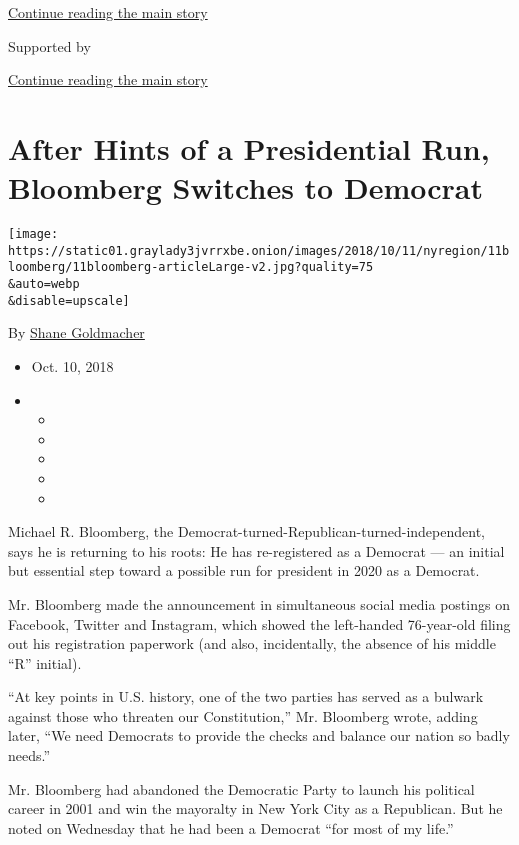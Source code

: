 \protect\hyperlink{after-top}{Continue reading the main story}

Supported by

\protect\hyperlink{after-sponsor}{Continue reading the main story}

\hypertarget{after-hints-of-a-presidential-run-bloomberg-switches-to-democrat}{%
\section{After Hints of a Presidential Run, Bloomberg Switches to
Democrat}\label{after-hints-of-a-presidential-run-bloomberg-switches-to-democrat}}

\texttt{[image: https://static01.graylady3jvrrxbe.onion/images/2018/10/11/nyregion/11bloomberg/11bloomberg-articleLarge-v2.jpg?quality=75\\\&auto=webp\\\&disable=upscale]}

By \href{https://www.nytimes3xbfgragh.onion/by/shane-goldmacher}{Shane
Goldmacher}

\begin{itemize}
\item
  Oct. 10, 2018
\item
  \begin{itemize}
  \item
  \item
  \item
  \item
  \item
  \end{itemize}
\end{itemize}

Michael R. Bloomberg, the Democrat-turned-Republican-turned-independent,
says he is returning to his roots: He has re-registered as a Democrat
--- an initial but essential step toward a possible run for president in
2020 as a Democrat.

Mr. Bloomberg made the announcement in simultaneous social media
postings on Facebook, Twitter and Instagram, which showed the
left-handed 76-year-old filing out his registration paperwork (and also,
incidentally, the absence of his middle ``R'' initial).

``At key points in U.S. history, one of the two parties has served as a
bulwark against those who threaten our Constitution,'' Mr. Bloomberg
wrote, adding later, ``We need Democrats to provide the checks and
balance our nation so badly needs.''

Mr. Bloomberg had abandoned the Democratic Party to launch his political
career in 2001 and win the mayoralty in New York City as a Republican.
But he noted on Wednesday that he had been a Democrat ``for most of my
life.''

